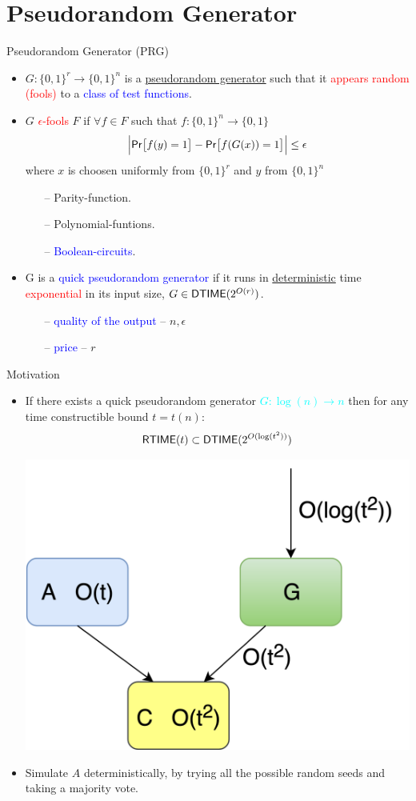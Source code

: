 \documentclass[xcolor={table,dvipsnames,usenames}]{beamer}
\begin{document}
\section{Pseudorandom Generator}
\begin{frame}{Pseudorandom Generator (PRG)}
\begin{itemize}
	\item $G: \{0,1\}^r \rightarrow \{0,1\}^n$ is a {\underline{pseudorandom generator}} such that it \textcolor{red}{appears random (fools)} to a \textcolor{blue}{class of test functions}.
	\pause
	\item $G$ \textcolor{red}{$\epsilon$-fools} $F$ if $\forall f \in F$ such that $f: \{0,1\}^n \rightarrow \{0,1\}$
	$$\Big|\mathsf{Pr}\big[f(y) = 1\big] -  \mathsf{Pr}\big[f(G(x)) = 1 \big]\Big| \leq \epsilon$$
	where $x$ is choosen uniformly from $\{0,1\}^r$ and $y$ from $\{0,1\}^n$
	\pause
	\begin{itemize}
		\item[--] Parity-function.
		\item[--] Polynomial-funtions.
		\item[--] \textcolor{blue}{Boolean-circuits}.
	\end{itemize}
	\pause
	\item G is a \textcolor{blue}{quick pseudorandom generator} if it runs in \underline{deterministic} time \textcolor{red}{exponential} in its input size, $G \in \mathsf{DTIME} (2^{O(r)})$.
	\pause 
	\begin{itemize}
		\item[--] \textcolor{blue}{quality of the output} -- $n,\epsilon$
		\item[--] \textcolor{blue}{price} -- $r$
	\end{itemize}
\end{itemize}
\end{frame}
\begin{frame}{Motivation}
\begin{itemize}
	\item If there exists a quick pseudorandom generator \textcolor{cyan}{$G: \log(n) \rightarrow n$} then for any time constructible bound $t=t(n):$ 
	\textcolor{red}{$$\mathsf{RTIME}(t) \subset \mathsf{DTIME}(2^{O(\log(t^2))})$$}
	\pause
	\begin{center}
			        \includegraphics[width=0.4\columnwidth]{figures/RandomSimulation}
	\end{center}
\pause
\item  Simulate $A$ deterministically, by trying all the possible random seeds and taking a majority vote. 
\end{itemize}
\end{frame}
\end{document}
